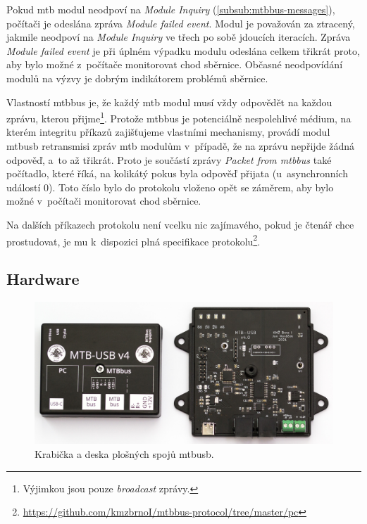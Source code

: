 Pokud \gls{mtb} modul neodpoví na \textit{Module Inquiry}
(\ref{subsub:mtbbus-messages}), počítači je odeslána zpráva \textit{Module
failed event}. Modul je považován za ztracený, jakmile neodpoví na
\textit{Module Inquiry} ve třech po sobě jdoucích iteracích. Zpráva
\textit{Module failed event} je při úplném výpadku modulu odeslána
celkem třikrát proto, aby bylo možné z~počítače monitorovat chod sběrnice.
Občasné neodpovídání modulů na výzvy je dobrým indikátorem problémů sběrnice.

Vlastností \gls{mtbbus} je, že každý \gls{mtb} modul musí vždy
odpovědět na každou zprávu, kterou přijme\footnote{Výjimkou jsou pouze
\textit{broadcast} zprávy.}. Protože \gls{mtbbus} je potenciálně nespolehlivé
médium, na kterém integritu příkazů zajišťujeme vlastními mechanismy, provádí
modul \gls{mtbusb} retransmisi zpráv \gls{mtb} modulům v~případě, že na zprávu
nepřijde žádná odpověď, a~to až třikrát. Proto je součástí zprávy \textit{Packet
from \gls{mtbbus}} také počítadlo, které říká, na kolikátý pokus byla
odpověď přijata (u~asynchronních událostí $0$). Toto číslo bylo do protokolu
vloženo opět se záměrem, aby bylo možné v~počítači monitorovat chod sběrnice.

Na dalších příkazech protokolu není vcelku nic zajímavého, pokud je čtenář chce
prostudovat, je mu k~dispozici plná specifikace protokolu\footnote{
\url{https://github.com/kmzbrnoI/mtbbus-protocol/tree/master/pc}}.

\subsection{Hardware} \label{subsec:mtbusb:hardware}

\begin{figure}[ht]
\includegraphics[width=\textwidth]{data/usb-inside.jpg}
\caption{Krabička a deska plošných spojů \gls{mtbusb}.}
\label{fig:mtbusb-inside}
\end{figure}

